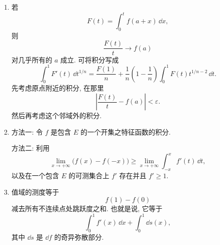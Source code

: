\begin{enumerate}
	\item 若
	\[
	F(t)=\int_0^t f(a+x)\,\dd x,
	\]
	则
	\[
	\frac{F(t)}{t}\to f(a)
	\]
	对几乎所有的 \(a\) 成立. 可将积分写成
	\[
	\int_0^1 F'(t)\,\dd t^{1/n}
	=
	\frac{F(1)}{n}
	+
	\frac1n\left(1-\frac1n\right)
	\int_0^1 F(t)t^{1/n-2}\,\dd t.
	\]
	先考虑原点附近的积分, 在那里
	\[
	\left|\frac{F(t)}{t}-f(a)\right|<\varepsilon.
	\]
	然后再考虑这个邻域外的积分.
	
	\item 方法一: 令 \(f\) 是包含 \(E\) 的一个开集之特征函数的积分.
	
	方法二: 利用
	\[
	\lim_{x\to+\infty}\bigl(f(x)-f(-x)\bigr)
	\geq
	\lim_{x\to+\infty}\int_{-x}^{x}f'(t)\,\dd t,
	\]
	以及在一个包含 \(E\) 的可测集合上 \(f'\) 存在并且 \(f'\geq1\).
	
	\item 值域的测度等于
	\[
	f(1)-f(0)
	\]
	减去所有不连续点处跳跃度之和. 也就是说, 它等于
	\[
	\int_0^1 f'(x)\,\dd x+\int_0^1 \dd s(x),
	\]
	其中 \(\dd s\) 是 \(\dd f\) 的奇异弥散部分.
\end{enumerate}
